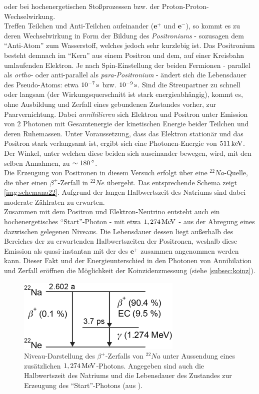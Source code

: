 \documentclass[numbers=noenddot,a4paper,notitlepage,twoside]{scrartcl}
\newcommand{\degree}{^\circ}
\newcommand{\tenpo}[1]{ 10^{#1}}
\newcommand{\tilt}[1]{\textit{#1}}
\begin{document}
			oder bei hochenergetischen Stoßprozessen bzw. der Proton-Proton-Wechselwirkung.\\
			Treffen Teilchen und Anti-Teilchen aufeinander ($\textbf{e}^+$ und $\textbf{e}^-$), so kommt es zu deren Wechselwirkung in Form der Bildung des \tilt{Positroniums} - sozusagen dem "`Anti-Atom"' zum Wasserstoff, welches jedoch sehr kurzlebig ist. Das Positronium besteht demnach im "`Kern"' aus einem Positron und dem, auf einer Kreisbahn umlaufenden Elektron. Je nach Spin-Einstellung der beiden Fermionen - parallel als \tilt{ortho-} oder anti-parallel als \tilt{para-Positronium} - ändert sich die Lebensdauer des Pseudo-Atoms: etwa $\unit[\tenpo{-7}]{s}$ bzw. $\unit[\tenpo{-9}]{s}$. Sind die Streupartner zu schnell oder langsam (der Wirkungsquerschnitt ist stark energieabhängig), kommt es, ohne Ausbildung und Zerfall eines gebundenen Zustandes vorher, zur Paarvernichtung. Dabei \tilt{annihilieren} sich Elektron und Positron unter Emission von 2 Photonen mit Gesamtenergie der kinetischen Energie beider Teilchen und deren Ruhemassen. Unter Voraussetzung, dass das Elektron stationär und das Positron stark verlangsamt ist, ergibt sich eine Photonen-Energie von $\unit[511]{keV}$. Der Winkel, unter welchen diese beiden sich auseinander bewegen, wird, mit den selben Annahmen, zu $\sim\unit[180]{\degree}$.\\
			Die Erzeugung von Positronen in diesem Versuch erfolgt über eine $^{22}Na$-Quelle, die über einen $\beta^+$-Zerfall in $^{22}Ne$ übergeht. Das entsprechende Schema zeigt \autoref{img:schemana22}. Aufgrund der langen Halbwertszeit des Natriums sind dabei moderate Zählraten zu erwarten.\\
			Zusammen mit dem Positron und Elektron-Neutrino entsteht auch ein hochenergetisches "`Start"'-Photon - mit etwa $\unit[1,274]{MeV}$ - aus der Abregung eines dazwischen gelegenen Niveaus. Die Lebensdauer dessen liegt außerhalb des Bereiches der zu erwartenden Halbwertszeiten der Positronen, weshalb diese Emission als quasi-instantan mit der des $\textbf{e}^+$ zusammen angenommen werden kann. Dieser Fakt und der Energieunterschied in den Photonen von Annihilation und Zerfall eröffnen die Möglichkeit der Koinzidenzmessung (siehe \ref{subsec:koinz}).\\

							\begin{figure}[t]
								\centering
								\includegraphics[width=0.7\textwidth]{termschema.png}
								\caption{Niveau-Darstellung des $\beta^+$-Zerfalls von $^{22}Na$ unter Aussendung eines zusätzlichen $\unit[1,274]{MeV}$-Photons. Angegeben sind auch die Halbwertszeit des Natriums und die Lebensdauer des Zustandes zur Erzeugung des "`Start"'-Photons (aus \cite{Augsten08}).}
								\label{img:schemana22}
							\end{figure}
\end{document}
